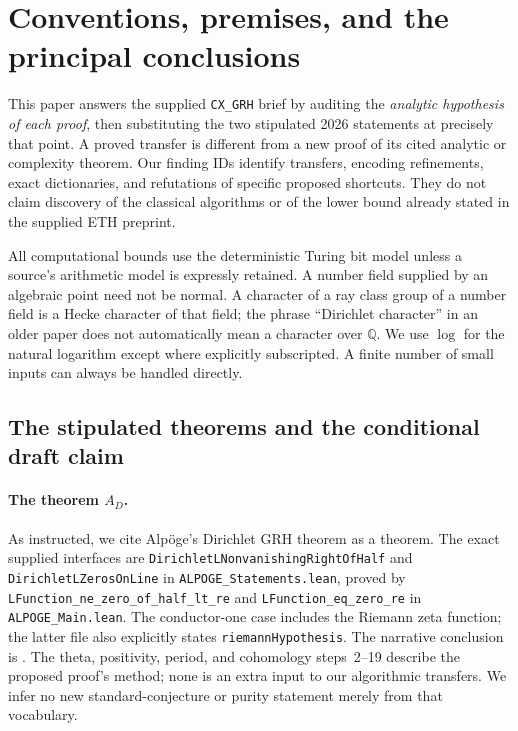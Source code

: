 \section{Conventions, premises, and the principal conclusions}
\label{sec:premises}

This paper answers the supplied \texttt{CX\_GRH} brief by auditing the
\emph{analytic hypothesis of each proof}, then substituting the two stipulated
2026 statements at precisely that point.  A proved transfer is different from
a new proof of its cited analytic or complexity theorem.  Our finding IDs
identify transfers, encoding refinements, exact dictionaries, and refutations
of specific proposed shortcuts.  They do not claim discovery of the classical
algorithms or of the lower bound already stated in the supplied ETH preprint.

All computational bounds use the deterministic Turing bit model unless a
source's arithmetic model is expressly retained.  A number field supplied by
an algebraic point need not be normal.  A character of a ray class group of a
number field is a Hecke character of that field; the phrase ``Dirichlet
character'' in an older paper does not automatically mean a character over
$\mathbb Q$.  We use $\log$ for the natural logarithm except where explicitly
subscripted.  A finite number of small inputs can always be handled directly.

\subsection{The stipulated theorems and the conditional draft claim}

\paragraph{The theorem $A_D$.}
As instructed, we cite Alp\"oge's Dirichlet GRH theorem as a theorem.
The exact supplied interfaces are
\texttt{DirichletLNonvanishingRightOfHalf} and
\texttt{DirichletLZerosOnLine} in \texttt{ALPOGE\_Statements.lean}, proved by
\nolinkurl{LFunction_ne_zero_of_half_lt_re} and
\nolinkurl{LFunction_eq_zero_re} in \texttt{ALPOGE\_Main.lean}.
The conductor-one case includes the Riemann zeta function; the latter file
also explicitly states \texttt{riemannHypothesis}.  The narrative conclusion
is \cite[Remark, p.~4, step~20]{Alpoge2026}.  The theta, positivity, period,
and cohomology steps~2--19 describe the proposed proof's method; none is an
extra input to our algorithmic transfers.  We infer no new standard-conjecture
or purity statement merely from that vocabulary.

